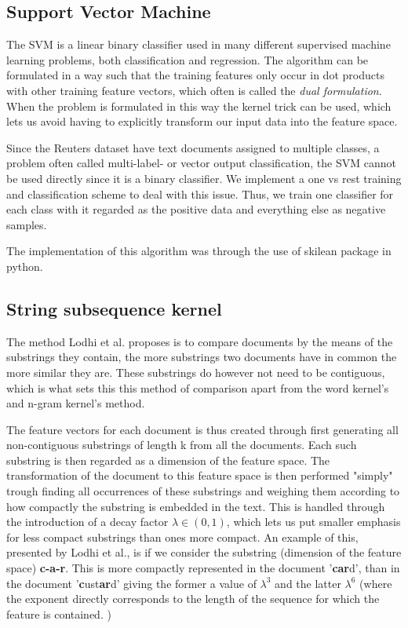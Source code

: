 \subsection{Support Vector Machine}
The SVM is a linear binary classifier used in many different supervised machine learning problems, both classification and regression. The algorithm can be formulated in a way such that the training features only occur in dot products with other training feature vectors, which often is called the \textit{dual formulation}. When the problem is formulated in this way the kernel trick can be used, which lets us avoid having to explicitly transform our input data into the feature space. 

Since the Reuters dataset have text documents assigned to multiple classes, a problem often called multi-label- or vector output classification, the SVM cannot be used directly since it is a binary classifier. We implement a one vs rest training and classification scheme to deal with this issue. Thus, we train one classifier for each class with it regarded as the positive data and everything else as negative samples. 

The implementation of this algorithm was through the use of skilean package in python. 

\subsection{String subsequence kernel}
The method Lodhi et al. proposes is to compare documents by the means of the substrings they contain, the more substrings two documents have in common the more similar they are. These substrings do however not need to be contiguous, which is what sets this this method of comparison apart from the word kernel's and n-gram kernel's method.


The feature vectors for each document is thus created through first generating all non-contiguous substrings of length k from all the documents. Each such substring is then regarded as a dimension of the feature space. The transformation of the document to this feature space is then performed "simply" trough finding all occurrences of these substrings and weighing them according to how compactly the substring is embedded in the text. This is handled through the introduction of a decay factor $ \lambda \in (0,1) $, which lets us put smaller emphasis for less compact substrings than ones more compact. An example of this, presented by Lodhi et al., is if we consider the substring (dimension of the feature space) \textbf{c-a-r}. This is more compactly represented in the document '\textbf{car}d', than in the document '\textbf{c}ust\textbf{ar}d' giving the former a value of $ \lambda^3 $ and the latter $ \lambda^6 $ (where the exponent directly corresponds to the length of the sequence for which the feature is contained. )

